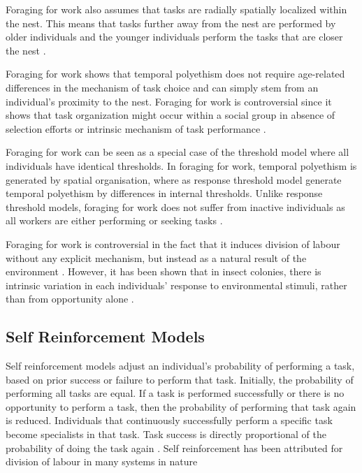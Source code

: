 
Foraging for work also assumes that tasks are radially spatially localized within the nest. This means that  tasks further away from the nest are performed by older individuals and the younger individuals perform the tasks that are closer the nest \cite{tofts1993algorithms}.

Foraging for work shows that temporal polyethism does not require age-related differences in the mechanism of task choice and can simply stem from an individual's proximity to the nest. Foraging for work is controversial since it shows that task organization might occur within a social group in absence of selection efforts or intrinsic mechanism of task performance \cite{franks1994foraging}. 

Foraging for work can be seen as a special case of the threshold model where all individuals have identical thresholds. In foraging for work, temporal polyethism is generated by spatial organisation, where as response threshold model generate temporal polyethism by differences in internal thresholds. Unlike response threshold models, foraging for work does not suffer from inactive individuals as all workers are either performing or seeking tasks \cite{beshers2001models}.

Foraging for work is controversial in the fact that it induces division of labour without any explicit mechanism, but instead as a natural result of the environment \cite{beshers2001models}. However, it has been shown that in insect colonies, there is intrinsic variation in each individuals' response to environmental  stimuli, rather than from opportunity alone \cite{julian1999undertaking}.

\subsection{Self Reinforcement Models}
\label{selfreinforcement}

Self reinforcement models adjust an individual's probability of performing a task, based on prior success or failure to perform that task. Initially, the probability of performing all tasks are equal. If a task is performed successfully or there is  no opportunity to perform a task, then the probability of performing that task again is reduced. Individuals that continuously successfully perform a specific task become specialists in that task. Task success is directly proportional of the probability of doing the task again \cite{theraulaz1998response, pasteels1987individual}. Self reinforcement has been attributed for division of labour in many systems in nature \cite{spencer1998dynamics}%

